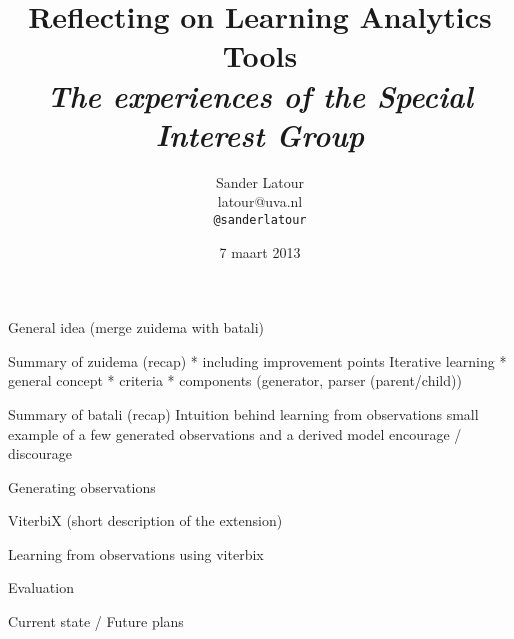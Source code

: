 \documentclass[11pt,a4paper,xcolor=dvipsnames]{beamer}
\author[Sander Latour]{Sander Latour\\\small{latour@uva.nl}\\\small{\texttt{@sanderlatour}}}
\institute{Universiteit van Amsterdam}
\title[Reflecting on Learning Analytics Tools]{\textbf{Reflecting on Learning Analytics Tools}\\\textit{The experiences of the Special Interest Group}}
\date{7 maart 2013}
\begin{document}
\begin{frame}
\titlepage
\end{frame}

\begin{frame}
\tableofcontents
\end{frame}

\begin{frame}
  General idea (merge zuidema with batali)
\end{frame}

\begin{frame}
  Summary of zuidema (recap)
  * including improvement points
  Iterative learning
  * general concept
  * criteria
  * components (generator, parser (parent/child))
\end{frame}

\begin{frame}
  Summary of batali (recap)
Intuition behind learning from observations
small example of a few generated observations and a derived model
  encourage / discourage
\end{frame}

\begin{frame}
  Generating observations
\end{frame}

\begin{frame}
  ViterbiX (short description of the extension)
\end{frame}

\begin{frame}
  Learning from observations using viterbix
\end{frame}

\begin{frame}
  Evaluation
\end{frame}

\begin{frame}
  Current state / Future plans
\end{frame}
\end{document}
